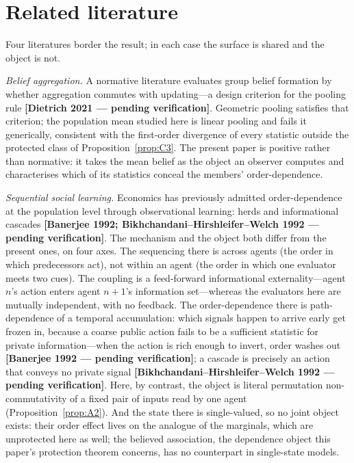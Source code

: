 \documentclass[review,12pt,authoryear]{elsarticle}
\theoremstyle{remark}
\theoremstyle{definition}
\newcommand{\pcite}[1]{\textbf{[#1 --- pending verification]}}
\begin{document}
\section{Related literature}
\label{sec:literature}

Four literatures border the result; in each case the surface is shared and the object is not.

\emph{Belief aggregation.} A normative literature evaluates group belief formation by whether
aggregation commutes with updating---a design criterion for the pooling rule
\pcite{Dietrich 2021}. Geometric pooling satisfies that criterion; the population mean studied
here is linear pooling and fails it generically, consistent with the first-order divergence of
every statistic outside the protected class of Proposition~\ref{prop:C3}. The present paper is
positive rather than normative: it takes the mean belief as the object an observer computes and
characterises which of its statistics conceal the members' order-dependence.

\emph{Sequential social learning.} Economics has previously admitted order-dependence at the
population level through observational learning: herds and informational cascades
\pcite{Banerjee 1992; Bikhchandani--Hirshleifer--Welch 1992}. The mechanism and the object both
differ from the present ones, on four axes. The sequencing there is across agents (the order in
which predecessors act), not within an agent (the order in which one evaluator meets two cues).
The coupling is a feed-forward informational externality---agent $n$'s action enters agent
$n{+}1$'s information set---whereas the evaluators here are mutually independent, with no
feedback. The order-dependence there is path-dependence of a temporal accumulation: which
signals happen to arrive early get frozen in, because a coarse public action fails to be a
sufficient statistic for private information---when the action is rich enough to invert, order
washes out \pcite{Banerjee 1992}; a cascade is precisely an action that conveys no private
signal \pcite{Bikhchandani--Hirshleifer--Welch 1992}. Here, by contrast, the object is literal
permutation non-commutativity of a fixed pair of inputs read by one agent
(Proposition~\ref{prop:A2}). And the state there is single-valued, so no joint object exists:
their order effect lives on the analogue of the marginals, which are unprotected here as well;
the believed association, the dependence object this paper's protection theorem concerns, has no
counterpart in single-state models.
\end{document}
